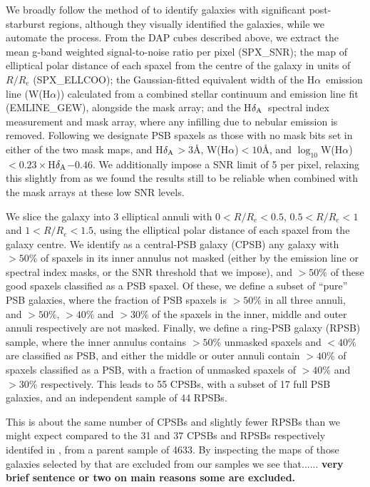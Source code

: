 \documentclass[fleqn,usenatbib]{mnras}
\newcommand{\hda}{H$\delta_{\rm A}$}
\newcommand{\Wha}{W(H$\alpha$)}
\newcommand{\ha}{H$\alpha$}
\begin{document}
We broadly follow the method of \citet{Chen2019} to identify galaxies with significant post-starburst regions, although they visually identified the galaxies, while we automate the process. From the DAP cubes described above, we extract the mean g-band weighted signal-to-noise ratio per pixel (SPX\_SNR); the map of elliptical polar distance of each spaxel from the centre of the galaxy in units of $R/R_e$ (SPX\_ELLCOO); the Gaussian-fitted equivalent width of the \ha\ emission line (\Wha) calculated from a combined stellar continuum and emission line fit (EMLINE\_GEW), alongside the mask array; and the \hda\ spectral index measurement and mask array, where any infilling due to nebular emission is removed. Following \citet{Chen2019} we designate PSB spaxels as those with no mask bits set in either of the two mask maps, and \hda$>3$\AA, \Wha$<10$\AA, and $\log_{10}$\Wha$<0.23\times$\hda$-0.46$. We additionally impose a SNR limit of 5 per pixel, relaxing this slightly from \citet{Chen2019} as we found the results still to be reliable when combined with the mask arrays at these low SNR levels. 

We slice the galaxy into 3 elliptical annuli with $0<R/R_e<0.5$, $0.5<R/R_e<1$ and $1<R/R_e<1.5$, using the elliptical polar distance of each spaxel from the galaxy centre. We  identify as a central-PSB galaxy (CPSB) any galaxy with $>50$\% of spaxels in its inner annulus not masked (either by the emission line or spectral index masks, or the SNR threshold that we impose), and $>50$\% of these good spaxels classified as a PSB spaxel. Of these, we define a subset of ``pure'' PSB galaxies, where the fraction of PSB spaxels is $>50$\% in all three annuli, and $>50$\%, $>40$\% and $>30$\% of the spaxels in the inner, middle and outer annuli respectively are not masked. Finally, we define a ring-PSB galaxy (RPSB) sample, where the inner annulus contains $>50$\% unmasked spaxels and $<40$\% are classified as PSB, and either the middle or outer annuli contain $>40$\% of spaxels classified as a PSB, with a fraction of unmasked spaxels of  $>40$\% and $>30$\% respectively. This leads to 55 CPSBs, with a subset of 17 full PSB galaxies, and an independent sample of 44 RPSBs. 

This is about the same number of CPSBs and slightly fewer RPSBs than we might expect compared to the 31 and 37 CPSBs and RPSBs respectively identifed in \citet{Chen2019}, from a parent sample of 4633. By inspecting the maps of those galaxies selected by \citet{Chen2019} that are excluded from our samples we see that...... {\bf very brief sentence or two on main reasons some are excluded. }
\end{document}

